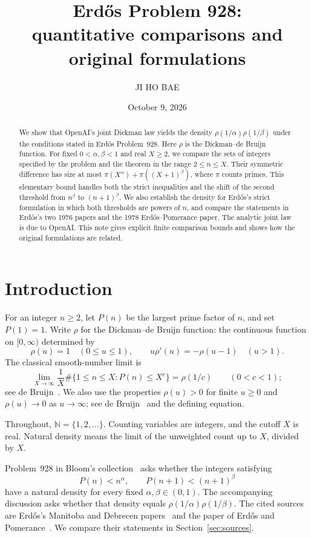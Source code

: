 \documentclass[11pt,a4paper]{amsart}
\title[Erd\H{o}s Problem 928 and the joint Dickman law]{Erd\H{o}s Problem 928:\\
quantitative comparisons and original formulations}
\author{JI HO BAE}
\date{October 9, 2026}
\newcommand{\N}{\mathbb N}
\begin{document}
\begin{abstract}
We show that OpenAI's joint Dickman law yields the density
$\rho(1/\alpha)\rho(1/\beta)$ under the conditions stated in
Erd\H{o}s Problem~928. Here $\rho$ is the Dickman--de Bruijn function.
For fixed $0<\alpha,\beta<1$ and real $X\ge2$, we compare the sets of
integers specified by the problem and the theorem in the range
$2\le n\le X$. Their symmetric difference has size at most
\mbox{$\pi(X^\alpha)+\pi((X+1)^\beta)$}, where $\pi$ counts primes.
This elementary bound handles both the strict inequalities and the
shift of the second threshold from $n^\beta$ to $(n+1)^\beta$.
We also establish the density for Erd\H{o}s's strict formulation in
which both thresholds are powers of $n$, and compare the statements
in Erd\H{o}s's two 1976 papers and the 1978 Erd\H{o}s--Pomerance paper.
The analytic joint law is due to OpenAI. This note gives explicit
finite comparison bounds and shows how the original formulations are related.
\end{abstract}
\maketitle

\section{Introduction}

For an integer $n\ge2$, let $P(n)$ be the largest prime factor of $n$, and set
$P(1)=1$. Write $\rho$ for the Dickman--de Bruijn function: the continuous
function on $[0,\infty)$ determined by
\[
 \rho(u)=1\quad(0\le u\le1),\qquad
 u\rho'(u)=-\rho(u-1)\quad(u>1).
\]
The classical smooth-number limit is
\begin{equation}\label{eq:marginal}
 \lim_{X\to\infty}\frac1X
 \#\{1\le n\le X:P(n)\le X^c\}=\rho(1/c)
 \qquad(0<c<1);
\end{equation}
see de Bruijn~\cite[p.~51, (1.1)--(1.2)]{deBruijn1951}.
We also use the properties $\rho(u)>0$ for finite $u\ge0$
and $\rho(u)\to0$ as $u\to\infty$; see
de Bruijn~\cite[p.~52, (1.8)]{deBruijn1951} and the defining equation.

Throughout, $\N=\{1,2,\ldots\}$. Counting variables are integers,
and the cutoff $X$ is real. Natural density means the limit of the
unweighted count up to $X$, divided by $X$.

Problem~928 in Bloom's collection~\cite{Bloom928} asks whether the
integers satisfying
\begin{equation}\label{eq:problem}
 P(n)<n^\alpha,\qquad P(n+1)<(n+1)^\beta
\end{equation}
have a natural density for every fixed $\alpha,\beta\in(0,1)$.
The accompanying discussion asks whether that density equals
$\rho(1/\alpha)\rho(1/\beta)$. The cited sources are Erd\H{o}s's
Manitoba and Debrecen papers~\cite{Erdos1976Manitoba,Erdos1976Debrecen}
and the paper of Erd\H{o}s and Pomerance~\cite{ErdosPomerance1978}.
We compare their statements in Section~\ref{sec:sources}.
\end{document}
